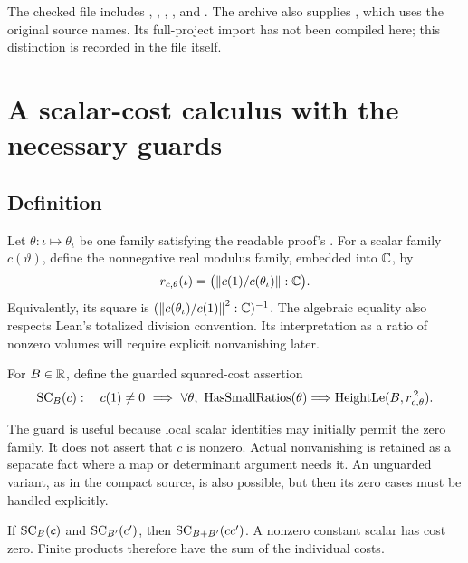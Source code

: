 The checked file includes , , ,
, and . The archive also supplies
, which uses the original
source names. Its full-project import has not been compiled here;
this distinction is recorded in the file itself.

\section{A scalar-cost calculus with the necessary guards}
\label{sec:cost}

\subsection{Definition}

Let \(\theta:\iota\mapsto\theta_\iota\) be one family satisfying the readable
proof's . For a scalar family \(c(\vartheta)\), define
the nonnegative real modulus family, embedded into \(\mathbb C\), by
\[
 r_{c,\theta}(\iota)
   =\bigl(\left\lVert c(1)/c(\theta_\iota)\right\rVert:\mathbb C\bigr).
\]
Equivalently, its square is
\((\left\lVert c(\theta_\iota)/c(1)\right\rVert^2:\mathbb C)^{-1}\).
The algebraic equality also respects Lean's totalized division convention.
Its interpretation as a ratio of nonzero volumes will require explicit
nonvanishing later.

\begin{definition}
For \(B\in\mathbb R\), define the guarded squared-cost assertion
\begin{equation}
 \SC_B(c):\quad
 c(1)\ne0\ \Longrightarrow\
 \forall\theta,\ 
 \operatorname{HasSmallRatios}(\theta)\Longrightarrow
 \HLe(B,r_{c,\theta}^{\,2}).
\end{equation}
\end{definition}

The guard is useful because local scalar identities may initially permit
the zero family. It does not assert that \(c\) is nonzero. Actual
nonvanishing is retained as a separate fact where a map or determinant
argument needs it. An unguarded variant, as in the compact source, is also
possible, but then its zero cases must be handled explicitly.

\begin{proposition}
If \(\operatorname{SC}_B(c)\) and \(\operatorname{SC}_{B'}(c')\), then
\(\operatorname{SC}_{B+B'}(cc')\). A nonzero constant scalar has cost zero.
Finite products therefore have the sum of the individual costs.
\end{proposition}

